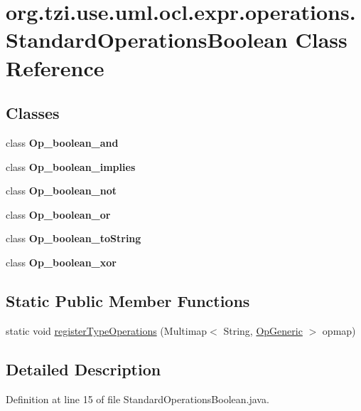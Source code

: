 \hypertarget{classorg_1_1tzi_1_1use_1_1uml_1_1ocl_1_1expr_1_1operations_1_1_standard_operations_boolean}{\section{org.\-tzi.\-use.\-uml.\-ocl.\-expr.\-operations.\-Standard\-Operations\-Boolean Class Reference}
\label{classorg_1_1tzi_1_1use_1_1uml_1_1ocl_1_1expr_1_1operations_1_1_standard_operations_boolean}
}
\subsection*{Classes}
\begin{DoxyCompactItemize}
\item 
class {\bfseries Op\-\_\-boolean\-\_\-and}
\item 
class {\bfseries Op\-\_\-boolean\-\_\-implies}
\item 
class {\bfseries Op\-\_\-boolean\-\_\-not}
\item 
class {\bfseries Op\-\_\-boolean\-\_\-or}
\item 
class {\bfseries Op\-\_\-boolean\-\_\-to\-String}
\item 
class {\bfseries Op\-\_\-boolean\-\_\-xor}
\end{DoxyCompactItemize}
\subsection*{Static Public Member Functions}
\begin{DoxyCompactItemize}
\item 
static void \hyperlink{classorg_1_1tzi_1_1use_1_1uml_1_1ocl_1_1expr_1_1operations_1_1_standard_operations_boolean_a28d0d211df4a4dcc4e83af3bc026be7d}{register\-Type\-Operations} (Multimap$<$ String, \hyperlink{classorg_1_1tzi_1_1use_1_1uml_1_1ocl_1_1expr_1_1operations_1_1_op_generic}{Op\-Generic} $>$ opmap)
\end{DoxyCompactItemize}


\subsection{Detailed Description}


Definition at line 15 of file Standard\-Operations\-Boolean.\-java.




